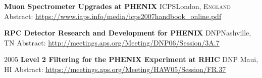 {\textbf{Muon Spectrometer Upgrades at PHENIX}}
{}
{ICPS}{London, \textsc{England}}
{\hspace{4mm}Abstract: \url{https://www.iaps.info/media/icps2007handbook_online.pdf}}

{\textbf{RPC Detector Research and Development for PHENIX}}
{}
{DNP}{Nashville, \textsc{TN}}
{\hspace{4mm}Abstract: \url{http://meetings.aps.org/Meeting/DNP06/Session/3A.7}}

\cventry
{2005}
{\textbf{Level 2 Filtering for the PHENIX Experiment at RHIC}}
{}
{DNP}
{Maui, \textsc{HI}}
{\hspace{4mm}Abstract: \url{https://meetings.aps.org/Meeting/HAW05/Session/FR.37}}
